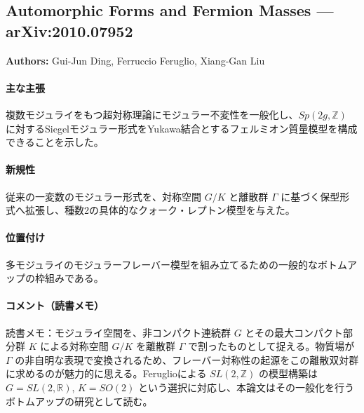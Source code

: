 \subsection{Automorphic Forms and Fermion Masses --- arXiv:2010.07952}

\textbf{Authors:} Gui-Jun Ding, Ferruccio Feruglio, Xiang-Gan Liu

\paragraph{主な主張}
複数モジュライをもつ超対称理論にモジュラー不変性を一般化し、$Sp(2g,\mathbb{Z})$ に対するSiegelモジュラー形式をYukawa結合とするフェルミオン質量模型を構成できることを示した\cite{Ding:2020zxw}。

\paragraph{新規性}
従来の一変数のモジュラー形式を、対称空間 $G/K$ と離散群 $\Gamma$ に基づく保型形式へ拡張し、種数2の具体的なクォーク・レプトン模型を与えた。

\paragraph{位置付け}
多モジュライのモジュラーフレーバー模型を組み立てるための一般的なボトムアップの枠組みである。

\paragraph{コメント（読書メモ）}
読書メモ：モジュライ空間を、非コンパクト連続群 $G$ とその最大コンパクト部分群 $K$ による対称空間 $G/K$ を離散群 $\Gamma$ で割ったものとして捉える。物質場が $\Gamma$ の非自明な表現で変換されるため、フレーバー対称性の起源をこの離散双対群に求めるのが魅力的に思える。Feruglioによる $SL(2,\mathbb{Z})$ の模型構築\cite{Feruglio:2017spp}は $G=SL(2,\mathbb{R})$, $K=SO(2)$ という選択に対応し、本論文はその一般化を行うボトムアップの研究として読む。
